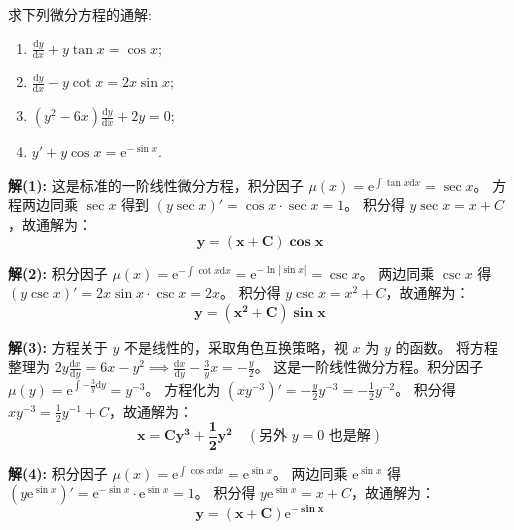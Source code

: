 \documentclass[lang=cn,11pt]{elegantbook}
\begin{document}
\begin{exercise}[一阶线性微分方程求通解]
求下列微分方程的通解:
\begin{enumerate}
    \item[(1)] $\displaystyle \frac{\mathrm{d}y}{\mathrm{d}x} + y\tan x = \cos x$;
    \item[(2)] $\displaystyle \frac{\mathrm{d}y}{\mathrm{d}x} - y\cot x = 2x\sin x$;
    \item[(3)] $\displaystyle (y^2 - 6x)\frac{\mathrm{d}y}{\mathrm{d}x} + 2y = 0$;
    \item[(4)] $\displaystyle y' + y\cos x = \mathrm{e}^{-\sin x}$.
\end{enumerate}
\end{exercise}
\begin{solution}
\textbf{解(1):}
这是标准的一阶线性微分方程，积分因子 $\mu(x) = \mathrm{e}^{\int \tan x\mathrm{d}x} = \sec x$。
方程两边同乘 $\sec x$ 得到 $(y\sec x)' = \cos x \cdot \sec x = 1$。
积分得 $y\sec x = x + C$，故通解为：
\[
\mathbf{y = (x+C)\cos x}
\]

\textbf{解(2):}
积分因子 $\mu(x) = \mathrm{e}^{-\int \cot x\mathrm{d}x} = \mathrm{e}^{-\ln|\sin x|} = \csc x$。
两边同乘 $\csc x$ 得 $(y\csc x)' = 2x\sin x \cdot \csc x = 2x$。
积分得 $y\csc x = x^2 + C$，故通解为：
\[
\mathbf{y = (x^2+C)\sin x}
\]

\textbf{解(3):}
方程关于 $y$ 不是线性的，采取角色互换策略，视 $x$ 为 $y$ 的函数。
将方程整理为 $\displaystyle 2y\frac{\mathrm{d}x}{\mathrm{d}y} = 6x - y^2 \implies \frac{\mathrm{d}x}{\mathrm{d}y} - \frac{3}{y}x = -\frac{y}{2}$。
这是一阶线性微分方程。积分因子 $\mu(y) = \mathrm{e}^{\int -\frac{3}{y}\mathrm{d}y} = y^{-3}$。
方程化为 $(x y^{-3})' = -\frac{y}{2}y^{-3} = -\frac{1}{2}y^{-2}$。
积分得 $xy^{-3} = \frac{1}{2}y^{-1} + C$，故通解为：
\[
\mathbf{x = Cy^3 + \frac{1}{2}y^2} \quad (\text{另外 } y=0 \text{ 也是解})
\]

\textbf{解(4):}
积分因子 $\mu(x) = \mathrm{e}^{\int \cos x\mathrm{d}x} = \mathrm{e}^{\sin x}$。
两边同乘 $\mathrm{e}^{\sin x}$ 得 $(y\mathrm{e}^{\sin x})' = \mathrm{e}^{-\sin x} \cdot \mathrm{e}^{\sin x} = 1$。
积分得 $y\mathrm{e}^{\sin x} = x + C$，故通解为：
\[
\mathbf{y = (x+C)\mathrm{e}^{-\sin x}}
\]
\end{solution}
\end{document}
